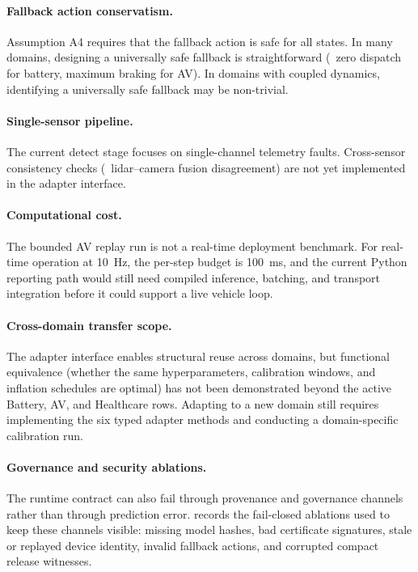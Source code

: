 \paragraph{Fallback action conservatism.}
Assumption A4 requires that the fallback action is safe for all states.  In many
domains, designing a universally safe fallback is straightforward (\eg~zero
dispatch for battery, maximum braking for AV).  In domains with coupled dynamics,
identifying a universally safe fallback may be non-trivial.

\paragraph{Single-sensor pipeline.}
The current detect stage focuses on single-channel telemetry faults.  Cross-sensor
consistency checks (\eg~lidar--camera fusion disagreement) are not yet implemented
in the adapter interface.

\paragraph{Computational cost.}
The bounded AV replay run is not a real-time deployment benchmark.  For real-time
operation at 10~Hz, the per-step budget is 100~ms, and the current Python reporting
path would still need compiled inference, batching, and transport integration before
it could support a live vehicle loop.

\paragraph{Cross-domain transfer scope.}
The adapter interface enables structural reuse across domains, but functional
equivalence (whether the same hyperparameters, calibration windows, and inflation
schedules are optimal) has not been demonstrated beyond the active Battery, AV,
and Healthcare rows.  Adapting to a new domain still requires implementing the six
typed adapter methods and conducting a domain-specific calibration run.


\paragraph{Governance and security ablations.}
The runtime contract can also fail through provenance and governance channels rather
than through prediction error.   records the
fail-closed ablations used to keep these channels visible: missing model hashes,
bad certificate signatures, stale or replayed device identity, invalid fallback
actions, and corrupted compact release witnesses.

